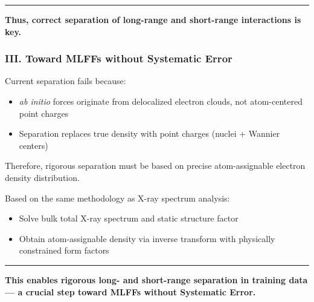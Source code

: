 \documentclass{beamer}
\begin{document}
\begin{frame}
		\vspace{3.2cm}
		\noindent\rule{\textwidth}{0.4pt}
		\centering
		\small
		\textbf{Thus, correct separation of long-range and short-range interactions is key.}   
	\end{frame}
	
		\begin{frame}
		\frametitle{III. Toward MLFFs without Systematic Error} 
		\footnotesize
		
	    Current separation fails because:
	    \begin{itemize}
	    	\item \textit{ab initio} forces originate from delocalized electron clouds, not atom-centered point charges
	    	\item Separation replaces true density with point charges (nuclei + Wannier centers)
	    \end{itemize}
		
		\vspace{0.5cm}
		Therefore, rigorous separation must be based on precise atom-assignable electron density distribution.
		
		\vspace{0.4cm}
		Based on the same methodology as X-ray spectrum analysis:
		\begin{itemize}
			\item Solve bulk total X-ray spectrum and static structure factor
			\item Obtain atom-assignable density via inverse transform with physically constrained form factors
		\end{itemize}
		
		
		\vspace{0.8cm}
		\noindent\rule{\textwidth}{0.4pt}
		\centering
		\small
		\textbf{This enables rigorous long- and short-range separation in training data — a crucial step toward MLFFs without Systematic Error.}   
		

	\end{frame}
\end{document}
